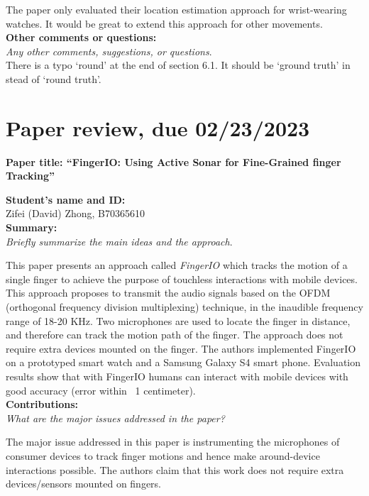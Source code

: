 \documentclass[11pt, oneside]{article}   	%
\begin{document}
The paper only evaluated their location estimation approach for wrist-wearing watches. It would be great to extend this approach for other movements.\\


\noindent \textbf{Other comments or questions:}\\
\emph{Any other comments, suggestions, or questions}.\\
There is a typo `round' at the end of section 6.1. It should be `ground truth' in stead of `round truth'.



\newpage
\section{Paper review, due 02/23/2023}
\begin{center}
\noindent
\textbf{\Large Paper title: ``FingerIO: Using Active Sonar for Fine-Grained finger Tracking''}
\end{center}


\noindent \textbf{Student's name and ID: }\\
Zifei (David) Zhong, B70365610\\

\noindent \textbf{Summary:}\\
\emph{Briefly summarize the main ideas and the approach}.

This paper presents an approach called \emph{FingerIO} which tracks the motion of a single finger to achieve the purpose of touchless interactions with mobile devices. This approach proposes to transmit the audio signals based on the OFDM (orthogonal frequency division multiplexing) technique, in the inaudible frequency range of 18-20 KHz. Two microphones are used to locate the finger in distance, and therefore can track the motion path of the finger. The approach does not require extra devices mounted on the finger. The authors implemented FingerIO on a prototyped smart watch and a Samsung Galaxy S4 smart phone. Evaluation results show that with FingerIO humans can interact with mobile devices with good accuracy (error within ~1 centimeter). \\

\noindent \textbf{Contributions:}\\
\emph{What are the major issues addressed in the paper?}

The major issue addressed in this paper is instrumenting the microphones of consumer devices to track finger motions and hence make around-device interactions possible. The authors claim that this work does not require extra devices/sensors mounted on fingers.\\
\end{document}
